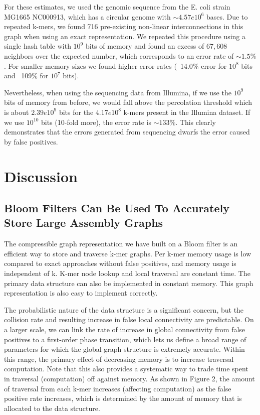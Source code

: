 \documentclass[12pt]{article} \usepackage{simplemargins}
\begin{document}
For these estimates, we used the genomic sequence from the E. coli strain 
MG1665 NC000913, which has a circular genome with $\sim 4.57e10^6$ bases. 
Due to 
repeated k-mers, we found 716 pre-existing non-linear interconnections in this graph 
when using an exact representation. We repeated this procedure 
using a single hash table with $10^9$ bits of memory and found an excess of 
$67,608$ neighbors over the expected number, which corresponds to an error rate of 
$\sim 1.5\%$. For smaller memory 
sizes we found higher error rates (~14.0\% error for $10^8$ bits and 
~109\% for $10^7$ bits).

Nevertheless, when using 
the sequencing data from Illumina, if we use the $10^9$ bits of memory 
from before, we would fall above the percolation threshold which is 
about $2.39e10^9$ bits for the 
$4.17e10^8$ k-mers present in the Illumina dataset. 
If we use $10^{10}$ bits (10-fold more), the error rate is 
$\sim 133\%$. This clearly demonstrates that
the errors generated from sequencing dwarfs the error caused by false positives.

\section{Discussion}

\subsection{Bloom Filters Can Be Used To Accurately Store Large Assembly Graphs}
The compressible graph representation we have built on a Bloom filter
is an efficient way to store and traverse k-mer graphs.  Per k-mer
memory usage is low compared to exact approaches without false positives,
and memory usage is independent of k.  K-mer node lookup and
local traversal are constant time.  The primary data structure can
also be implemented in constant memory.  This graph representation is
also easy to implement correctly.

The probabilistic nature of the data structure is a significant
concern, but the collision rate and resulting increase in false local
connectivity are predictable.  On a larger scale, we can link the
rate of increase in global connectivity from false positives to a
first-order phase transition, which lets us define a broad range of
parameters for which the global graph structure is extremely accurate.
Within this range, the primary effect of decreasing memory is to increase
traversal computation.  Note that this also provides a systematic way
to trade time spent in traversal (computation) off against memory. As shown 
in Figure 2, the amount of traversal from each k-mer increases 
(affecting computation) as the false positive rate increases, which 
is determined by the amount of memory that is allocated to the data 
structure.
\end{document}
